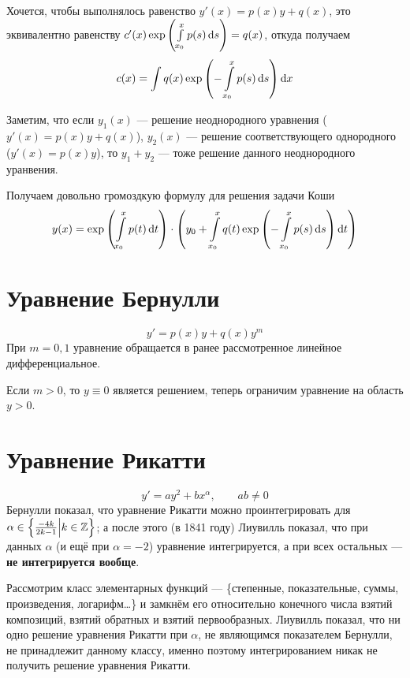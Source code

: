 \documentclass[a4paper]{report}
\begin{document}
{        Хочется, чтобы выполнялось равенство $y'(x) = p(x)y + q(x)$, это эквивалентно равенству $c'(x)\exp\left(\int\limits_{x_0}^{x}p(s)\operatorname{d}\! s\right) = q(x)$, откуда получаем
        \[c(x) = \int q(x)\exp\left(-\int\limits_{x_0}^{x}p(s)\operatorname{d}\! s\right)\operatorname{d}\! x\]

        \item Заметим, что если $y_1(x)$ --- решение неоднородного уравнения ($y'(x) = p(x)y + q(x)$), $y_2(x)$ --- решение соответствующего однородного ($y'(x) = p(x)y$), то $y_1 + y_2$ --- тоже решение данного неоднородного уранвения.

        Получаем довольно громоздкую формулу для решения задачи Коши
        \[y(x) = \exp\left(\int\limits_{x_0}^{x}p(t)\operatorname{d}\! t\right)\cdot \left(y_0 + \int\limits_{x_0}^{x}q(t)\exp\left(-\int\limits_{x_0}^{x}p(s)\operatorname{d}\! s\right)\operatorname{d}\! t\right)\]
    }


    \section{Уравнение Бернулли}
    \[y' = p(x)y + q(x)y^m\]
    При $m = 0, 1$ уравнение обращается в ранее рассмотренное линейное дифференциальное.

    Если $m > 0$, то $y \equiv 0$ является решением, теперь ограничим уравнение на область $y > 0$.


    \section{Уравнение Рикатти}
    \[y' = ay^2 + bx^{\alpha}, \qquad ab \ne 0\]
    Бернулли показал, что уравнение Рикатти можно проинтегрировать для $\alpha \in \left\{\frac{-4 k}{2k - 1}\middle|k \in \mathbb{Z}\right\}$;
    а после этого (в 1841 году) Лиувилль показал, что при данных $\alpha$ (и ещё при $\alpha = -2$) уравнение интегрируется, а при всех остальных --- \textbf{не интегрируется вообще}.

    Рассмотрим класс элементарных функций --- \{степенные, показательные, суммы, произведения, логарифм\ldots\} и замкнём его относительно конечного числа взятий композиций, взятий обратных и взятий первообразных.
    Лиувилль показал, что ни одно решение уравнения Рикатти при $\alpha$, не являющимся показателем Бернулли, не принадлежит данному классу, именно поэтому интегрированием никак не получить решение уравнения Рикатти.
\end{document}
